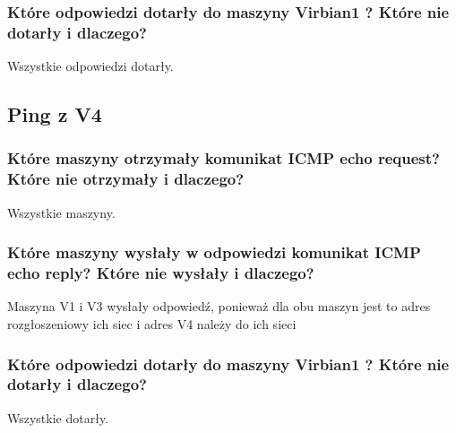 \documentclass{article}
\begin{document}
\subsubsection{Które odpowiedzi dotarły do maszyny Virbian1 ? Które nie dotarły i dlaczego?}
Wszystkie odpowiedzi dotarły.

\subsection{Ping z V4}

\subsubsection{Które maszyny otrzymały komunikat ICMP echo request? Które nie otrzymały i dlaczego?}
Wszystkie maszyny.

\subsubsection{Które maszyny wysłały w odpowiedzi komunikat ICMP echo reply? Które nie wysłały i dlaczego?}
Maszyna V1 i V3 wysłały odpowiedź, ponieważ dla obu maszyn jest to adres rozgłoszeniowy ich siec i adres V4 należy do ich sieci

\subsubsection{Które odpowiedzi dotarły do maszyny Virbian1 ? Które nie dotarły i dlaczego?}
Wszystkie dotarły.
\end{document}
